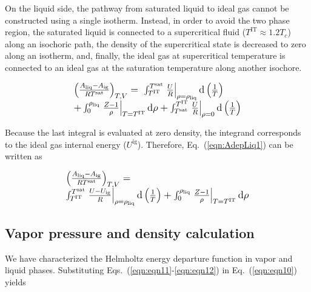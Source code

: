 \documentclass[5p,times]{elsarticle}
\begin{document}
On the liquid side, the pathway from saturated liquid to ideal gas cannot be constructed using a single isotherm. Instead, in order to avoid the two phase region, the saturated liquid is connected to a supercritical fluid ($T^\mathrm{IT} \approx 1.2 T_{c}$) along an isochoric path, the density of the supercritical state is decreased to zero along an isotherm, and, finally, the ideal gas at supercritical temperature is connected to an ideal gas at the saturation temperature along another isochore.
 
\begin{equation}
\begingroup
\large
\begin{array}{l}
\left( \frac{A_\mathrm{liq} -A_\mathrm{ig} }{RT^\mathrm{sat}} \right)_{T,V} =\; \int _{T^{\mathrm{IT}}}^{T^{\mathrm{\mathrm{sat}}}
} \left.\frac{U}{R} \right\vert_{\rho={\rho_\mathrm{liq}}} \mathrm{d} \left(\frac{1}{T} \right)
\\ 
+ \int _{0}^{\rho _{\mathrm{liq}} } \left.\frac{Z-1}{\rho }\right\vert_{T=T^{\mathrm{IT}}} \mathrm{d}\rho + \int _{T^{\mathrm{sat}}}^{T^{\mathrm{\mathrm{IT}}}
} \left. \frac{U}{R} \right\vert_{\rho=0} \mathrm{d} \left(\frac{1}{T} \right) 
\end{array} 
\endgroup
\label{eqn:AdepLiq1}
\end{equation}

Because the last integral is evaluated at zero density, the integrand corresponds to the ideal gas internal energy ($U^\mathrm{ig}$). Therefore, Eq.~(\ref{eqn:AdepLiq1}) can be written as

\begin{equation}
\begingroup
\large
\begin{array}{l}
\left( \frac{A_\mathrm{liq} -A_\mathrm{ig} }{RT^\mathrm{sat}} \right)_{T,V} =
\\
\int _{T^{\mathrm{IT}}}^{T^{\mathrm{\mathrm{sat}}}
} \left. \frac{U-U_\mathrm{ig}}{R} \right\vert_{\rho=\rho_{\mathrm{liq}}} \mathrm{d} \left(\frac{1}{T} \right) + \int _{0}^{\rho _{\mathrm{liq}} } \left. \frac{Z-1}{\rho } \right\vert_{T=T^{\mathrm{IT}}} \mathrm{d}\rho   
\end{array} 
\endgroup
\label{eqn:AdepLiq2}
\end{equation}

\subsection{Vapor pressure and density calculation}
We have characterized the Helmholtz energy departure function in vapor and liquid phases. Substituting Eqs.~(\ref{eqn:eqn11}-\ref{eqn:eqn12}) in Eq.~(\ref{eqn:eqn10}) yields
\end{document}

